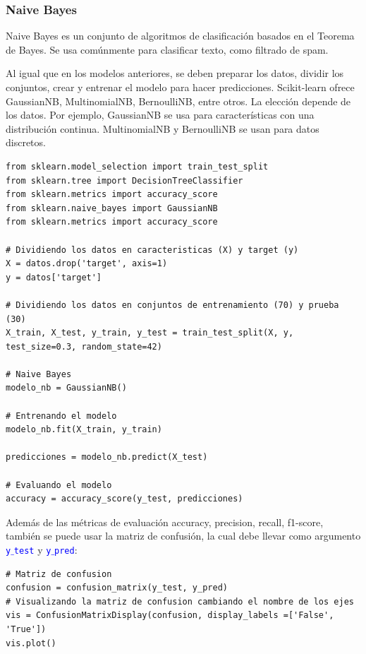\documentclass[a4paper, 12pt]{book}
\begin{document}
\subsubsection{Naive Bayes}
Naive Bayes es un conjunto de algoritmos de clasificación basados en el Teorema de Bayes. Se usa comúnmente para clasificar texto, como filtrado de spam.

Al igual que en los modelos anteriores, se deben preparar los datos, dividir los conjuntos, crear y entrenar el modelo para hacer predicciones. Scikit-learn ofrece GaussianNB, MultinomialNB, BernoulliNB, entre otros. La elección depende de los datos. Por ejemplo, GaussianNB se usa para características con una distribución continua. MultinomialNB y BernoulliNB se usan para datos discretos.

\begin{verbatim}
from sklearn.model_selection import train_test_split
from sklearn.tree import DecisionTreeClassifier
from sklearn.metrics import accuracy_score
from sklearn.naive_bayes import GaussianNB
from sklearn.metrics import accuracy_score

# Dividiendo los datos en caracteristicas (X) y target (y)
X = datos.drop('target', axis=1)
y = datos['target']

# Dividiendo los datos en conjuntos de entrenamiento (70) y prueba (30)
X_train, X_test, y_train, y_test = train_test_split(X, y, test_size=0.3, random_state=42)

# Naive Bayes
modelo_nb = GaussianNB()

# Entrenando el modelo
modelo_nb.fit(X_train, y_train)

predicciones = modelo_nb.predict(X_test)

# Evaluando el modelo
accuracy = accuracy_score(y_test, predicciones)
\end{verbatim}

Además de las métricas de evaluación accuracy, precision, recall, f1-score, también se puede usar la matriz de confusión, la cual debe llevar como argumento \texttt{\textcolor{blue}{y$\_$test}} y \texttt{\textcolor{blue}{y$\_$pred}}:
\begin{verbatim}
# Matriz de confusion
confusion = confusion_matrix(y_test, y_pred)
# Visualizando la matriz de confusion cambiando el nombre de los ejes
vis = ConfusionMatrixDisplay(confusion, display_labels =['False', 'True'])
vis.plot()
\end{verbatim}
\end{document}
